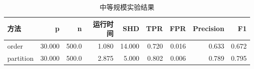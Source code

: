 \begin{table}[H]
\centering
\small
\setlength{\tabcolsep}{2pt}
\caption{中等规模实验结果}
\label{tab:medium}
\begin{tabular}{lrrrrrrrr}
\toprule
方法 & p & n & 运行时间 & SHD & TPR & FPR & Precision & F1
\\
\midrule
order & 30.000 & 500.0 & 1.080 & 14.000 & 0.720 & 0.016 & 0.633 & 0.672 \\
partition & 30.000 & 500.0 & 2.875 & 5.000 & 0.802 & 0.006 & 0.789 & 0.795 \\
\bottomrule
\end{tabular}
\end{table}
